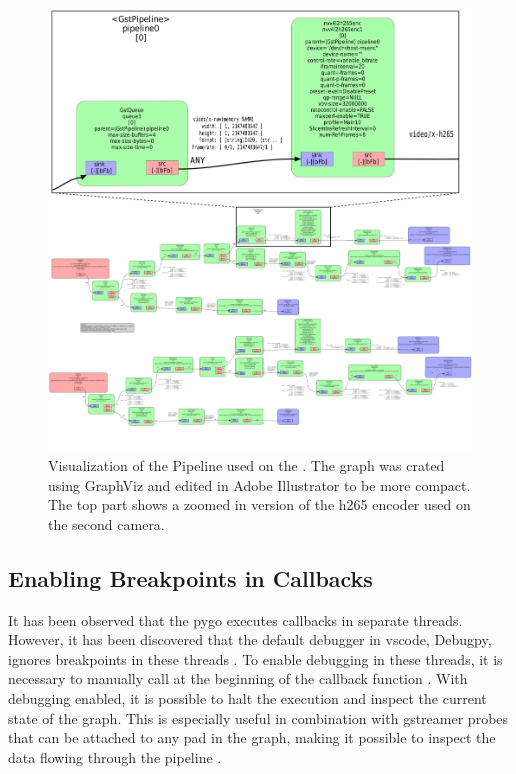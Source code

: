 \begin{figure}[H]
    \centering
    \includegraphics[width=\textwidth]{figures/gstreamer/gstreamer_pipeline.pdf}
    \caption{Visualization of the \gs Pipeline used on the \sr.
        The graph was crated using GraphViz and edited in Adobe Illustrator to be more compact.
        The top part shows a zoomed in version of the \gls{h265} encoder used on the second camera.}
    \label{fig:gs_pipeline_visualization}
\end{figure}

\subsection{Enabling Breakpoints in Callbacks}
It has been observed that the \gls{pygo} executes callbacks in separate threads.
However, it has been discovered that the default debugger in \gls{vscode}, Debugpy, ignores breakpoints in these threads \cite{microsoftDebugpyDebuggerPython2023}\cite{visualstudiocodeDebuggingConfigurationsPython2023}.
To enable debugging in these threads, it is necessary to manually call  at the beginning of the callback function \cite{nadigAnswerDebugNot2019}.
With debugging enabled, it is possible to halt the execution and inspect the current state of the graph.
This is especially useful in combination with \gls{gstreamer} probes that can be attached to any pad in the graph, making it possible to inspect the data flowing through the pipeline \cite{gstreamerProbes}.


